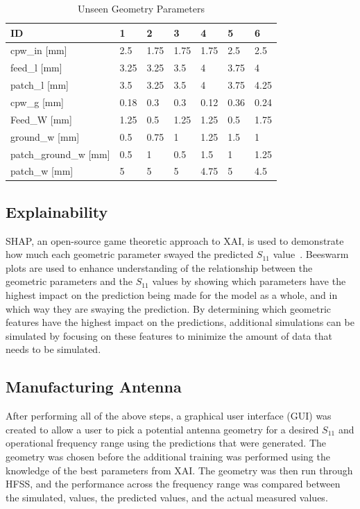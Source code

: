 \documentclass[conference]{IEEEtran}
\begin{document}
\begin{table}[h]
\caption{Unseen Geometry Parameters}
\begin{center}
\begin{tabular}{ |l|l|l|l|l|l|l| }
    \hline
    ID & 1 & 2 & 3 & 4 & 5 & 6 \\
    \hline
    cpw\_in [mm] & 2.5 & 1.75 & 1.75 & 1.75 & 2.5 & 2.5 \\
    \hline
    feed\_l [mm] & 3.25 & 3.25 & 3.5 & 4 & 3.75 & 4 \\
    \hline
    patch\_l [mm] & 3.5 & 3.25 & 3.5 & 4 & 3.75 & 4.25 \\
    \hline
    cpw\_g [mm] & 0.18 & 0.3 & 0.3 & 0.12 & 0.36 & 0.24 \\
    \hline
    Feed\_W [mm] & 1.25 & 0.5 & 1.25 & 1.25 & 0.5 & 1.75 \\
    \hline
    ground\_w [mm] & 0.5 & 0.75 & 1 & 1.25 & 1.5 & 1 \\
    \hline
    patch\_ground\_w [mm] & 0.5 & 1 & 0.5 & 1.5 & 1 & 1.25 \\
    \hline
    patch\_w [mm] & 5 & 5 & 5 & 4.75 & 5 & 4.5 \\
    \hline
\end{tabular}
\end{center}
\label{unseen_geometries_lw}
\end{table}    
    



\subsection{Explainability}
SHAP, an open-source game theoretic approach to XAI, is used to demonstrate how much each geometric parameter swayed the predicted $S_{11}$ value~\cite{NIPS2017_7062}. Beeswarm plots are used to enhance understanding of the relationship between the geometric parameters and the $S_{11}$ values by showing which parameters have the highest impact on the prediction being made for the model as a whole, and in which way they are swaying the prediction. By determining which geometric features have the highest impact on the predictions, additional simulations can be simulated by focusing on these features to minimize the amount of data that needs to be simulated. 

\subsection{Manufacturing Antenna}
After performing all of the above steps, a graphical user interface (GUI) was created to allow a user to pick a potential antenna geometry for a desired $S_{11}$ and operational frequency range using the predictions that were generated. The geometry was chosen before the additional training was performed using the knowledge of the best parameters from XAI. The geometry was then run through HFSS, and the performance across the frequency range was compared between the simulated, values, the predicted values, and the actual measured values. 
\end{document}
